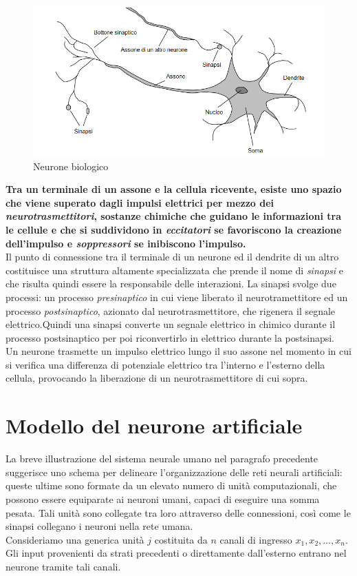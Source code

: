 \documentclass[12pt,a4paper,oneside]{book}
\begin{document}
		 \begin{figure}[h]
		 	\centering
		 	\includegraphics[width=1\linewidth]{IMMAGINI/neuron}
		 	\caption{Neurone biologico}
		 	\label{fig:neuron}
		 \end{figure}
	 
	 	\textbf{Tra un terminale di un assone e la cellula ricevente, esiste uno spazio che viene superato dagli impulsi elettrici per mezzo dei \emph{neurotrasmettitori}, sostanze chimiche che guidano le informazioni tra le cellule e che si suddividono in \emph{eccitatori} se favoriscono la creazione dell'impulso e \emph{soppressori} se inibiscono l'impulso.}\\ Il punto di connessione tra il terminale di un neurone ed il dendrite di un altro costituisce una struttura altamente specializzata che prende il nome di \emph{sinapsi} e che risulta quindi essere la responsabile delle interazioni. La sinapsi svolge due processi: un processo \emph{presinaptico} in cui viene liberato il neurotramettitore ed un processo \emph{postsinaptico}, azionato dal neurotrasmettitore, che rigenera il segnale elettrico.Quindi una sinapsi converte un segnale elettrico in chimico durante il processo postsinaptico per poi riconvertirlo in elettrico durante la postsinapsi.\\ 
	 	Un neurone trasmette un impulso elettrico lungo il suo assone nel momento in cui si verifica una differenza di potenziale elettrico tra l’interno e l’esterno della cellula, provocando la liberazione di un neurotrasmettitore di cui sopra.
		
		
		 
		
	\section{Modello del neurone artificiale}
		
		La breve illustrazione del sistema neurale umano nel paragrafo precedente suggerisce uno schema per delineare l'organizzazione delle reti neurali artificiali: queste ultime sono formate da un elevato numero di unità computazionali, che possono essere equiparate ai neuroni umani, capaci di eseguire una somma pesata. Tali unità sono collegate tra loro attraverso delle connessioni, così come le sinapsi collegano i neuroni nella rete umana. \\
		Consideriamo una generica unità $j$ costituita da $n$ canali di ingresso $x_{1}, x_{2}, ... ,x_{n}$.
		Gli input provenienti da strati precedenti o direttamente dall'esterno entrano nel neurone tramite tali canali.
\end{document}
